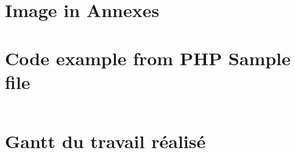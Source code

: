 \section{Image in Annexes}
	\newpage
\section{Code example from PHP Sample file}
	\begin{listing}[H]
	    \inputminted[breaklines,linenos]{php}{code/ppt.php}
	    \label{code:php-example}
    \end{listing}
\section{Gantt du travail réalisé}
	\label{gantt}
	\newpage
\clearpage